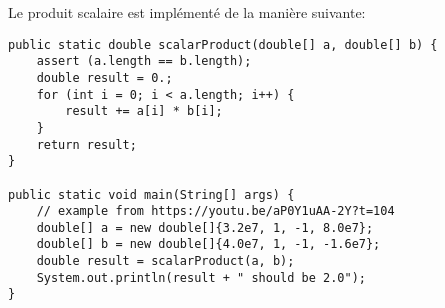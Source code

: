 Le produit scalaire est implémenté de la manière suivante:

\begin{verbatim}
public static double scalarProduct(double[] a, double[] b) {
    assert (a.length == b.length);
    double result = 0.;
    for (int i = 0; i < a.length; i++) {
        result += a[i] * b[i];
    }
    return result;
}

public static void main(String[] args) {
    // example from https://youtu.be/aP0Y1uAA-2Y?t=104
    double[] a = new double[]{3.2e7, 1, -1, 8.0e7};
    double[] b = new double[]{4.0e7, 1, -1, -1.6e7};
    double result = scalarProduct(a, b);
    System.out.println(result + " should be 2.0");
}
\end{verbatim}